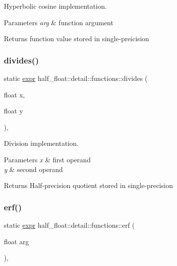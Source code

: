 Hyperbolic cosine implementation. 
\begin{DoxyParams}{Parameters}
{\em arg} & function argument \\
\hline
\end{DoxyParams}
\begin{DoxyReturn}{Returns}
function value stored in single-\/preicision 
\end{DoxyReturn}
\mbox{\label{structhalf__float_1_1detail_1_1functions_ac9dfde49f70098d39e83d1123574c60a}} 
\subsubsection{\texorpdfstring{divides()}{divides()}}
{\footnotesize\ttfamily static \hyperlink{structhalf__float_1_1detail_1_1expr}{expr} half\+\_\+float\+::detail\+::functions\+::divides (\begin{DoxyParamCaption}\item[{float}]{x,  }\item[{float}]{y }\end{DoxyParamCaption})\hspace{0.3cm}{\ttfamily [inline]}, {\ttfamily [static]}}

Division implementation. 
\begin{DoxyParams}{Parameters}
{\em x} & first operand \\
\hline
{\em y} & second operand \\
\hline
\end{DoxyParams}
\begin{DoxyReturn}{Returns}
Half-\/precision quotient stored in single-\/precision 
\end{DoxyReturn}
\mbox{\label{structhalf__float_1_1detail_1_1functions_aa6292fbc82ddddce2ed9853506a51af4}} 
\subsubsection{\texorpdfstring{erf()}{erf()}}
{\footnotesize\ttfamily static \hyperlink{structhalf__float_1_1detail_1_1expr}{expr} half\+\_\+float\+::detail\+::functions\+::erf (\begin{DoxyParamCaption}\item[{float}]{arg }\end{DoxyParamCaption})\hspace{0.3cm}{\ttfamily [inline]}, {\ttfamily [static]}}

